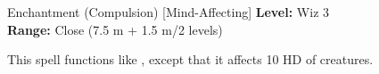 {Enchantment (Compulsion) [Mind-Affecting]}
{
	\textbf{Level:}
	Wiz 3\\
	\textbf{Range:}
	Close (7.5 m + 1.5 m/2 levels)\\
}
{
	This spell functions like , except that it affects 10 HD of creatures.

}
